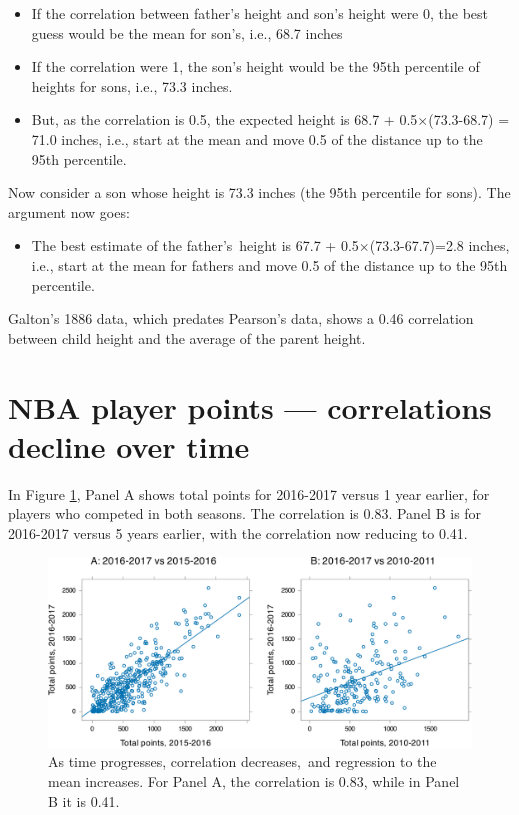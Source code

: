 \documentclass[
  10pt,
  b5paper]{book}
\providecommand{\tightlist}{%
  \setlength{\itemsep}{0pt}\setlength{\parskip}{0pt}}
\begin{document}
\begin{itemize}
\tightlist
\item
  If the correlation between father's height and son's height were 0,
  the best guess would be the mean for son's, i.e., 68.7 inches
\item
  If the correlation were 1, the son's height would be the
  95th percentile of heights for sons, i.e., 73.3 inches.
\item
  But, as the correlation is 0.5, the expected height is
  68.7 + 0.5\(\times\)(73.3-68.7) = 71.0 inches, i.e., start at
  the mean and move 0.5 of the distance up to the 95th percentile.
\end{itemize}

Now consider a son whose height is 73.3 inches (the 95th percentile for
sons). The argument now goes:

\begin{itemize}
\tightlist
\item
  The best estimate of the father's~height is 67.7 +
  0.5\(\times\)(73.3-67.7)=2.8 inches, i.e., start at the mean
  for fathers and move 0.5 of the distance up to the 95th percentile.
\end{itemize}

Galton's 1886 data, which predates Pearson's data, shows a 0.46
correlation between child height and the average of the parent
height.

\hypertarget{nba-player-points-correlations-decline-over-time}{%
\section{NBA player points --- correlations decline over time}\label{nba-player-points-correlations-decline-over-time}}

In Figure \ref{fig:NBA}, Panel A shows total points for
2016-2017 versus 1 year earlier, for players who competed
in both seasons. The correlation is 0.83. Panel B is
for 2016-2017 versus 5 years earlier, with the correlation
now reducing to 0.41.

\begin{figure}[H]

{\centering \includegraphics[width=1\linewidth]{07-regress_files/figure-latex/NBA-1} 

}

\caption{As time progresses, correlation decreases, and regression to the mean increases.  For Panel A, the correlation is 0.83, while in Panel B it is 0.41.}\label{fig:NBA}
\end{figure}
\end{document}
